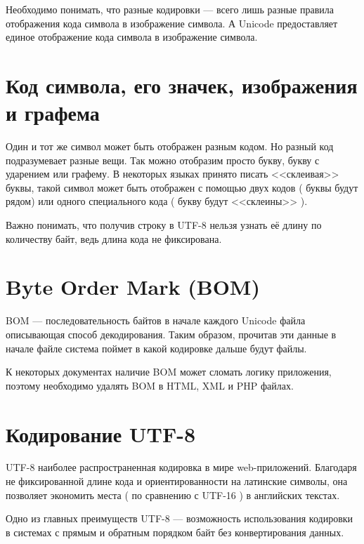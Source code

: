 
Необходимо понимать, что разные кодировки --- всего лишь разные правила отображения кода символа в изображение символа. А Unicode предоставляет единое отображение кода символа в изображение символа.

\section{Код символа, его значек, изображения и графема} \label{sect3_6}

Один и тот же символ может быть отображен разным кодом. Но разный код подразумевает разные вещи. Так можно отобразим просто букву, букву с ударением или графему. В некоторых языках принято писать <<склеивая>> буквы, такой символ может быть отображен с помощью двух кодов ( буквы будут рядом) или одного специального кода ( букву будут <<склеины>> ).


Важно понимать, что получив строку в UTF-8 нельзя узнать её длину по количеству байт, ведь длина кода не фиксирована.


\section{Byte Order Mark (BOM) } \label{sect3_7}

BOM --- последовательность байтов в начале каждого Unicode  файла описывающая способ декодирования. Таким образом, прочитав эти данные в начале файле система поймет в какой кодировке дальше будут файлы.


К некоторых документах наличие BOM может сломать логику приложения, поэтому необходимо удалять BOM в HTML, XML и PHP файлах.

\section{ Кодирование UTF-8 } \label{sect3_8}

UTF-8 наиболее распространенная кодировка в мире web-приложений. Благодаря не фиксированной длине кода и ориентированности на латинские символы, она позволяет экономить места ( по сравнению с UTF-16 ) в английских текстах.


Одно из главных преимуществ UTF-8 --- возможность использования кодировки в системах с прямым и обратным порядком байт без конвертирования данных.

